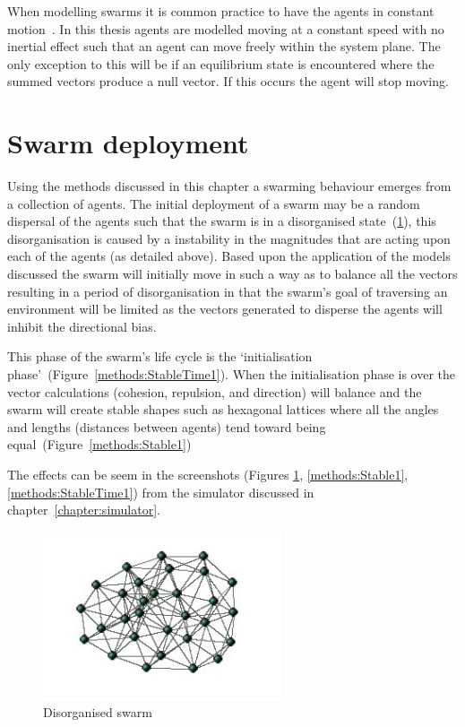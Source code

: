 When modelling swarms it is common practice to have the agents in constant motion~\cite{LCW:07, GKF:13}. In this thesis agents are modelled moving at a constant speed with no inertial effect such that an agent can move freely within the system plane. The only exception to this will be if an equilibrium state is encountered where the summed vectors produce a null vector. If this occurs the agent will stop moving.

\section{Swarm deployment}
Using the methods discussed in this chapter a swarming behaviour emerges from a collection of agents. The initial deployment of a swarm may be a random dispersal of the agents such that the swarm is in a disorganised state~(\ref{methods:Chaos1}), this disorganisation is caused by a instability in the magnitudes that are acting upon each of the agents (as detailed above). Based upon the application of the models discussed the swarm will initially move in such a way as to balance all the vectors resulting in a period of disorganisation in that the swarm's goal of traversing an environment will be limited as the vectors generated to disperse the agents will inhibit the directional bias. 

This phase of the swarm's life cycle is the `initialisation phase'~(Figure~\ref{methods:StableTime1}). When the initialisation phase is over the vector calculations (cohesion, repulsion, and direction) will balance and the swarm will create stable shapes such as hexagonal lattices where all the angles and lengths (distances between agents) tend toward being equal~(Figure~\ref{methods:Stable1})

The effects can be seem in the screenshots (Figures \ref{methods:Chaos1}, \ref{methods:Stable1}, \ref{methods:StableTime1}) from the simulator discussed in chapter~\ref{chapter:simulator}.

\begin{figure}[H]
\begin{center}
\includegraphics[width=7cm]{CHAPTER-2/figures/Chaos}
\end{center}
\caption{Disorganised swarm\label{methods:Chaos1}}
\end{figure}


